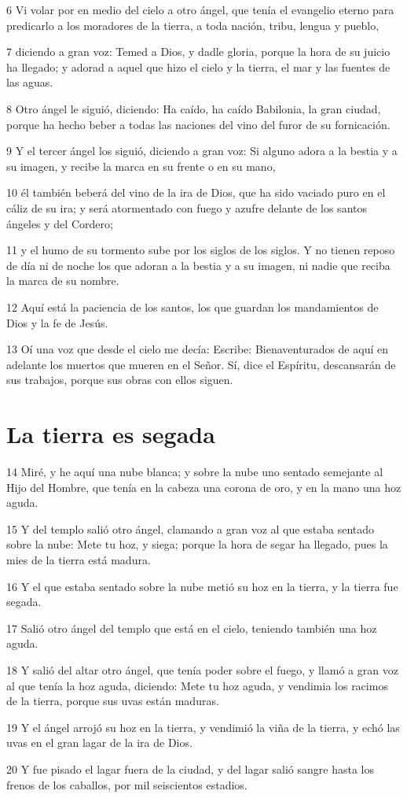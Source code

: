 \par 6 Vi volar por en medio del cielo a otro ángel, que tenía el evangelio eterno para predicarlo a los moradores de la tierra, a toda nación, tribu, lengua y pueblo,
\par 7 diciendo a gran voz: Temed a Dios, y dadle gloria, porque la hora de su juicio ha llegado; y adorad a aquel que hizo el cielo y la tierra, el mar y las fuentes de las aguas.
\par 8 Otro ángel le siguió, diciendo: Ha caído, ha caído Babilonia, la gran ciudad, porque ha hecho beber a todas las naciones del vino del furor de su fornicación.
\par 9 Y el tercer ángel los siguió, diciendo a gran voz: Si alguno adora a la bestia y a su imagen, y recibe la marca en su frente o en su mano,
\par 10 él también beberá del vino de la ira de Dios, que ha sido vaciado puro en el cáliz de su ira; y será atormentado con fuego y azufre delante de los santos ángeles y del Cordero;
\par 11 y el humo de su tormento sube por los siglos de los siglos. Y no tienen reposo de día ni de noche los que adoran a la bestia y a su imagen, ni nadie que reciba la marca de su nombre.
\par 12 Aquí está la paciencia de los santos, los que guardan los mandamientos de Dios y la fe de Jesús.
\par 13 Oí una voz que desde el cielo me decía: Escribe: Bienaventurados de aquí en adelante los muertos que mueren en el Señor. Sí, dice el Espíritu, descansarán de sus trabajos, porque sus obras con ellos siguen.

\section*{La tierra es segada}

\par 14 Miré, y he aquí una nube blanca; y sobre la nube uno sentado semejante al Hijo del Hombre, que tenía en la cabeza una corona de oro, y en la mano una hoz aguda.
\par 15 Y del templo salió otro ángel, clamando a gran voz al que estaba sentado sobre la nube: Mete tu hoz, y siega; porque la hora de segar ha llegado, pues la mies de la tierra está madura.
\par 16 Y el que estaba sentado sobre la nube metió su hoz en la tierra, y la tierra fue segada.
\par 17 Salió otro ángel del templo que está en el cielo, teniendo también una hoz aguda.
\par 18 Y salió del altar otro ángel, que tenía poder sobre el fuego, y llamó a gran voz al que tenía la hoz aguda, diciendo: Mete tu hoz aguda, y vendimia los racimos de la tierra, porque sus uvas están maduras.
\par 19 Y el ángel arrojó su hoz en la tierra, y vendimió la viña de la tierra, y echó las uvas en el gran lagar de la ira de Dios.
\par 20 Y fue pisado el lagar fuera de la ciudad, y del lagar salió sangre hasta los frenos de los caballos, por mil seiscientos estadios.


